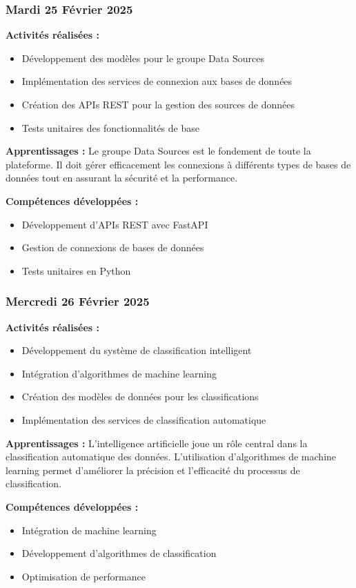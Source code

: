 \documentclass[12pt,a4paper]{article}
\begin{document}
\subsubsection{Mardi 25 Février 2025}
\textbf{Activités réalisées :}
\begin{itemize}
    \item Développement des modèles pour le groupe Data Sources
    \item Implémentation des services de connexion aux bases de données
    \item Création des APIs REST pour la gestion des sources de données
    \item Tests unitaires des fonctionnalités de base
\end{itemize}

\textbf{Apprentissages :}
Le groupe Data Sources est le fondement de toute la plateforme. Il doit gérer efficacement les connexions à différents types de bases de données tout en assurant la sécurité et la performance.

\textbf{Compétences développées :}
\begin{itemize}
    \item Développement d'APIs REST avec FastAPI
    \item Gestion de connexions de bases de données
    \item Tests unitaires en Python
\end{itemize}

\subsubsection{Mercredi 26 Février 2025}
\textbf{Activités réalisées :}
\begin{itemize}
    \item Développement du système de classification intelligent
    \item Intégration d'algorithmes de machine learning
    \item Création des modèles de données pour les classifications
    \item Implémentation des services de classification automatique
\end{itemize}

\textbf{Apprentissages :}
L'intelligence artificielle joue un rôle central dans la classification automatique des données. L'utilisation d'algorithmes de machine learning permet d'améliorer la précision et l'efficacité du processus de classification.

\textbf{Compétences développées :}
\begin{itemize}
    \item Intégration de machine learning
    \item Développement d'algorithmes de classification
    \item Optimisation de performance
\end{itemize}
\end{document}
